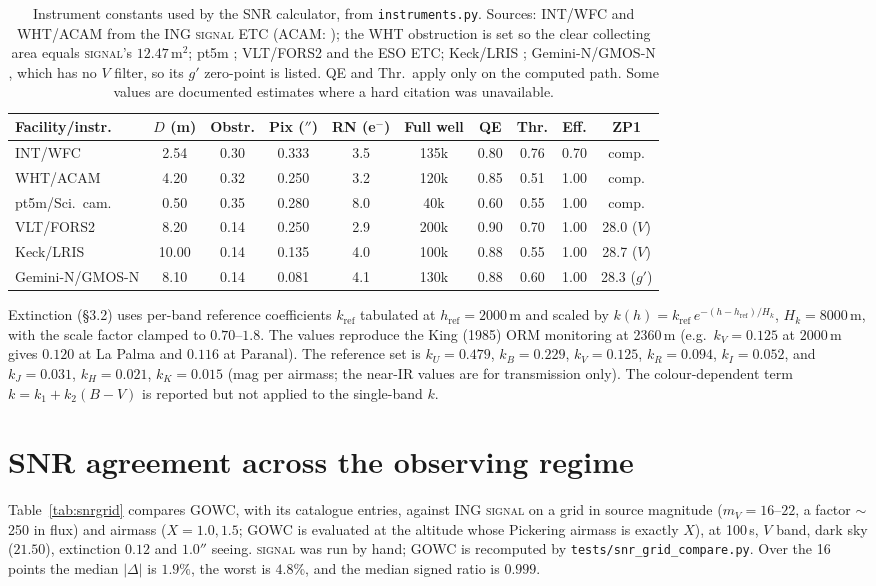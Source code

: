 \documentclass[11pt]{article}
\begin{document}
\begin{table}[!htbp]
\centering
\small
\setlength{\tabcolsep}{4pt}
\begin{tabular}{lccccccccc}
\hline
Facility/instr. & $D$ (m) & Obstr. & Pix ($''$) & RN (e$^-$) & Full well & QE & Thr. & Eff. & ZP1 \\
\hline
INT/WFC & 2.54 & 0.30 & 0.333 & 3.5 & 135k & 0.80 & 0.76 & 0.70 & comp. \\
WHT/ACAM & 4.20 & 0.32 & 0.250 & 3.2 & 120k & 0.85 & 0.51 & 1.00 & comp. \\
pt5m/Sci.\ cam. & 0.50 & 0.35 & 0.280 & 8.0 & 40k & 0.60 & 0.55 & 1.00 & comp. \\
VLT/FORS2 & 8.20 & 0.14 & 0.250 & 2.9 & 200k & 0.90 & 0.70 & 1.00 & 28.0 ($V$) \\
Keck/LRIS & 10.00 & 0.14 & 0.135 & 4.0 & 100k & 0.88 & 0.55 & 1.00 & 28.7 ($V$) \\
Gemini-N/GMOS-N & 8.10 & 0.14 & 0.081 & 4.1 & 130k & 0.88 & 0.60 & 1.00 & 28.3 ($g'$) \\
\hline
\end{tabular}
\caption{Instrument constants used by the SNR calculator, from \texttt{instruments.py}.
Sources: INT/WFC and WHT/ACAM from the ING \textsc{signal} ETC (ACAM: \cite{benn}); the
WHT obstruction is set so the clear collecting area equals \textsc{signal}'s
$12.47$\,m$^2$; pt5m \cite{hardy}; VLT/FORS2 \cite{appenzeller} and the ESO ETC;
Keck/LRIS \cite{oke}; Gemini-N/GMOS-N \cite{hook}, which has no $V$ filter, so its
$g'$ zero-point is listed. QE and Thr.\ apply only on the computed path. Some values
are documented estimates where a hard citation was unavailable.}
\label{tab:instr}
\end{table}

Extinction (\S3.2) uses per-band reference coefficients $k_{\text{ref}}$ tabulated at
$h_{\text{ref}}=2000$\,m and scaled by $k(h)=k_{\text{ref}}\,e^{-(h-h_{\text{ref}})/H_k}$,
$H_k=8000$\,m, with the scale factor clamped to $0.70$--$1.8$. The values reproduce
the King (1985) ORM monitoring at 2360\,m (e.g.\ $k_V=0.125$ at $2000$\,m gives
$0.120$ at La Palma and $0.116$ at Paranal). The reference set is $k_U=0.479$,
$k_B=0.229$, $k_V=0.125$, $k_R=0.094$, $k_I=0.052$, and $k_J=0.031$, $k_H=0.021$,
$k_K=0.015$ (mag per airmass; the near-IR values are for transmission only). The
colour-dependent term $k=k_1+k_2(B\!-\!V)$ is reported but not applied to the
single-band $k$.

\section{SNR agreement across the observing regime}
\label{app:snrgrid}
Table~\ref{tab:snrgrid} compares GOWC, with its catalogue entries, against ING
\textsc{signal} on a grid in source magnitude ($m_V=16$--$22$, a factor $\sim$250 in
flux) and airmass ($X=1.0,1.5$; GOWC is evaluated at the altitude whose Pickering
airmass is exactly $X$), at 100\,s, $V$ band, dark sky ($21.50$), extinction $0.12$ and
$1.0''$ seeing. \textsc{signal} was run by hand; GOWC is recomputed by
\texttt{tests/snr\_grid\_compare.py}. Over the 16 points the median $|\Delta|$ is
$1.9\%$, the worst is $4.8\%$, and the median signed ratio is $0.999$.
\end{document}
